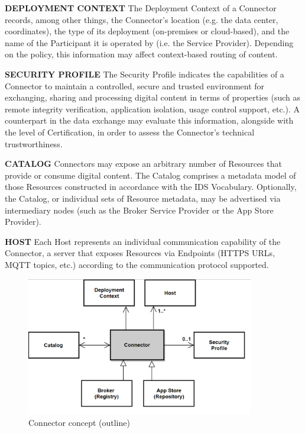 \textbf{DEPLOYMENT CONTEXT }The Deployment Context of a Connector records, among other things, the Connector’s location (e.g. the data center, coordinates), the type of its deployment (on-premises or cloud-based), and the name of the Participant it is operated by (i.e. the Service Provider). Depending on the policy, this information may affect context-based routing of content. 

\textbf{SECURITY PROFILE} The Security Profile indicates the capabilities of a Connector to maintain a controlled, secure and trusted environment for exchanging, sharing and processing digital content in terms of properties (such as remote integrity verification, application isolation, usage control support, etc.). A counterpart in the data exchange may evaluate this information, alongside with the level of Certification, in order to assess the Connector’s technical trustworthiness. 

\textbf{CATALOG} Connectors may expose an arbitrary number of Resources that provide or consume digital content. The Catalog comprises a metadata model of those Resources constructed in accordance with the IDS Vocabulary. Optionally, the Catalog, or individual sets of Resource metadata, may be advertised via intermediary nodes (such as the Broker Service Provider or the App Store Provider).

\textbf{HOST} Each Host represents an individual communication capability of the Connector, a server that exposes Resources via Endpoints (HTTPS URLs, MQTT topics, etc.) according to the communication protocol supported.




\begin{figure}[H]
	\begin{Center}
		\includegraphics[width=3.92in,height=2.38in]{./media/image50.png}
		\caption{Connector concept (outline)}
		\label{fig:Connector_concept_outline}
	\end{Center}
\end{figure}


